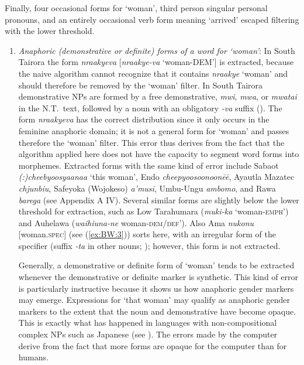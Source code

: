 \documentclass[output=collectionpaper]{langsci/langscibook}
\begin{document}
Finally, four occasional forms for ‘woman’, third person singular personal pronouns, and an entirely occasional verb form meaning ‘arrived’ escaped filtering with the lower threshold.

\begin{enumerate}[label=(\alph*)]
\item
\emph{Anaphoric (demonstrative or definite) forms of a word for ‘woman’}: In South Tairora the form \textit{nraakyeva} [\textit{nraakye-va} ‘woman-DEM’] is extracted, because the naive algorithm cannot recognize that it contains \textit{nraakye} ‘woman’ and should therefore be removed by the ‘woman’ filter. In South Tairora demonstrative NPs are formed by a free demonstrative, \textit{mwi}, \textit{mwa}, or \textit{mwatai} in the N.T.\ text, followed by a noun with an obligatory \textit{-va} suffix (\citealt[584]{Vincent2010}). The form \textit{nraakyeva} has the correct distribution since it only occurs in the feminine anaphoric domain; it is not a general form for ‘woman’ and passes therefore the ‘woman’ filter. This error thus derives from the fact that the algorithm applied here does not have the capacity to segment word forms into morphemes. Extracted forms with the same kind of error include Sabaot \textit{(:)cheebyoosyaanaa} ‘this woman’, Endo \textit{cheepyoosoonoonēē}, Ayautla Mazatec \textit{chjunbiu}, Safeyoka (Wojokeso) \textit{a'musi}, Umbu-Ungu \textit{ambomo}, and Rawa \textit{barega}
(see Appendix A IV). Several similar forms are slightly below the lower threshold for extraction, such as Low Tarahumara (\textit{muki-ka} ‘woman-\textsc{emph}') and Auhelawa (\textit{waihiuna-ne} woman-\textsc{dem/def}’). Also Ama \textit{nukonu} [woman.\textsc{spec}] (see (\ref{ex:BW:3})) sorts here, with an irregular form of the specifier (suffix \textit{-ta} in other nouns; \citealt[92]{Arsjoe1999}); however, this form is not extracted.

Generally, a demonstrative or definite form of ‘woman’ tends to be extracted whenever the demonstrative or definite marker is synthetic. This kind of error is particularly instructive because it shows us how anaphoric gender markers may emerge. Expressions for ‘that woman’ may qualify as anaphoric gender markers to the extent that the noun and demonstrative have become opaque. This is exactly what has happened in languages with non-compositional complex NPs such as Japanese (see  ). The errors made by the computer derive from the fact that more forms are opaque for the computer than for humans.


\end{enumerate}
\end{document}
